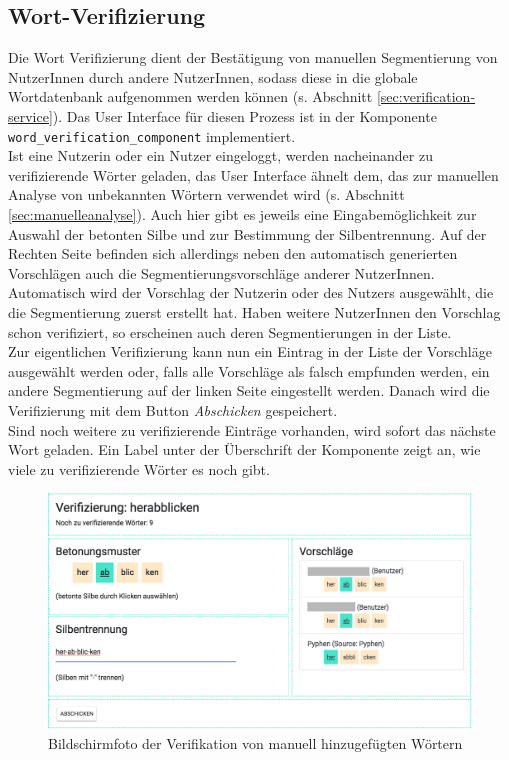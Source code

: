 \subsection{Wort-Verifizierung}

Die Wort Verifizierung dient der Bestätigung von manuellen Segmentierung von NutzerInnen durch andere NutzerInnen, sodass diese in die globale Wortdatenbank aufgenommen werden können (s. Abschnitt \ref{sec:verification-service}). Das User Interface für diesen Prozess ist in der Komponente \texttt{word\_verification\_component} implementiert.\\

Ist eine Nutzerin oder ein Nutzer eingeloggt, werden nacheinander zu verifizierende Wörter geladen, das User Interface ähnelt dem, das zur manuellen Analyse von unbekannten Wörtern verwendet wird (s. Abschnitt \ref{sec:manuelleanalyse}). Auch hier gibt es jeweils eine Eingabemöglichkeit zur Auswahl der betonten Silbe und zur Bestimmung der Silbentrennung. Auf der Rechten Seite befinden sich allerdings neben den automatisch generierten Vorschlägen auch die Segmentierungsvorschläge anderer NutzerInnen. Automatisch wird der Vorschlag der Nutzerin oder des Nutzers ausgewählt, die die Segmentierung zuerst erstellt hat. Haben weitere NutzerInnen den Vorschlag schon verifiziert, so erscheinen auch deren Segmentierungen in der Liste. \\

Zur eigentlichen Verifizierung kann nun ein Eintrag in der Liste der Vorschläge ausgewählt werden oder, falls alle Vorschläge als falsch empfunden werden, ein andere Segmentierung auf der linken Seite eingestellt werden. Danach wird die Verifizierung mit dem Button \textit{Abschicken} gespeichert.\\
Sind noch weitere zu verifizierende Einträge vorhanden, wird sofort das nächste Wort geladen. Ein Label unter der Überschrift der Komponente zeigt an, wie viele zu verifizierende Wörter es noch gibt.

\begin{figure}[h!]
	\centering
	\includegraphics[width=.8\linewidth]{figures/frontend/verifizierung}
	\caption{Bildschirmfoto der Verifikation von manuell hinzugefügten Wörtern}
	\label{fig:frontend-verification}
\end{figure}